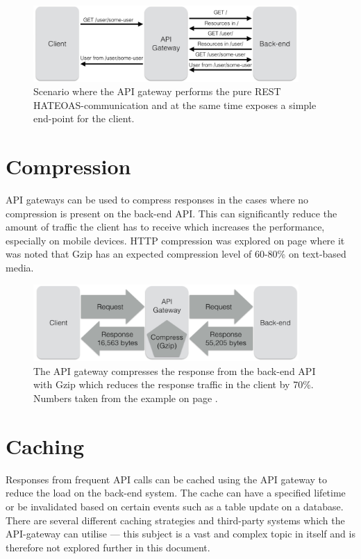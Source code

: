 \documentclass{cslthse-msc}
\begin{document}
\begin{figure}[H]
  \centering
    \begin{center}
      \includegraphics[width=0.9\textwidth]{images/api_gateway_hateoas.png}
    \end{center}
  \caption{Scenario where the API gateway performs the pure REST HATEOAS-communication and at the same time exposes a simple end-point for the client.}
\end{figure}

\section{Compression}
API gateways can be used to compress responses in the cases where no compression is present on the back-end API. This can significantly reduce the amount of traffic the client has to receive which increases the performance, especially on mobile devices. HTTP compression was explored on page \pageref{compression} where it was noted that Gzip has an expected compression level of 60-80\% on text-based media.

\begin{figure}[H]
  \centering
    \begin{center}
      \includegraphics[width=0.9\textwidth]{images/api_gateway_compression.png}
    \end{center}
  \caption{The API gateway compresses the response from the back-end API with Gzip which reduces the response traffic in the client by 70\%. Numbers taken from the example on page \pageref{compression}.}
\end{figure}

\section{Caching}
Responses from frequent API calls can be cached using the API gateway to reduce the load on the back-end system\cite[page 107]{AASG}. The cache can have a specified lifetime or be invalidated based on certain events such as a table update on a database. There are several different caching strategies and third-party systems which the API-gateway can utilise --- this subject is a vast and complex topic in itself and is therefore not explored further in this document.
\end{document}
